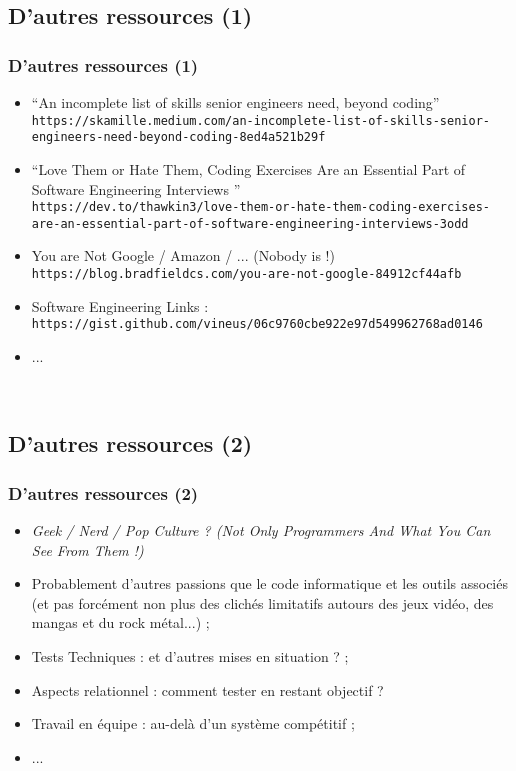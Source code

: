 \documentclass{beamer}
\begin{document}
\subsection{D'autres ressources (1)}
\begin{frame}
	\frametitle{D'autres ressources (1)}
	\begin{itemize}
		\small
		\item ``An incomplete list of skills senior engineers need, beyond coding''~\\
			\texttt{\footnotesize https://skamille.medium.com/an-incomplete-list-of-skills-senior-engineers-need-beyond-coding-8ed4a521b29f }
		\item ``Love Them or Hate Them, Coding Exercises Are an Essential Part of Software Engineering Interviews ''~\\
			\texttt{\footnotesize https://dev.to/thawkin3/love-them-or-hate-them-coding-exercises-are-an-essential-part-of-software-engineering-interviews-3odd }
		\item You are Not Google / Amazon / ... (Nobody is !)~\\
			\texttt{\footnotesize https://blog.bradfieldcs.com/you-are-not-google-84912cf44afb }
		\item Software Engineering Links : \texttt{\footnotesize https://gist.github.com/vineus/06c9760cbe922e97d549962768ad0146 }
		\item ... 
	\end{itemize}~\\
	
\end{frame} 

\subsection{D'autres ressources (2)}
\begin{frame}
	\frametitle{D'autres ressources (2)}
	\begin{itemize}
		\item \emph{Geek / Nerd / Pop Culture ? (Not Only Programmers And What You Can See From Them !)}
		\item Probablement d'autres passions que le code informatique et les outils associ{\'e}s (et pas forc{\'e}ment non plus des clich{\'e}s limitatifs autours des jeux vid{\'e}o, des mangas et du rock m{\'e}tal...) ;
		\item Tests Techniques : et d'autres mises en situation ? ; 
		\item Aspects relationnel : comment tester en restant objectif ?
		\item Travail en {\'e}quipe : au-del{\`a} d'un syst{\`e}me comp{\'e}titif ;  
		\item ... 
	\end{itemize}~\\
	
\end{frame} 
\end{document}
